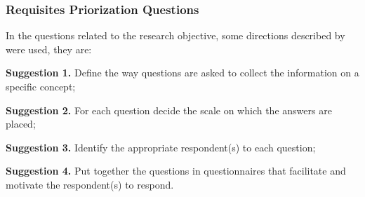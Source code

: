 \subsubsection{Requisites Priorization Questions}\label{sub:requisites-priorization}

In the questions related to the research objective, some directions described by \textcite{forza} were used, they are:
\begin{description}
  \item \textbf{Suggestion 1.} Define the way questions are asked to collect the information on a specific concept;\label{suggestion:1}
  \item \textbf{Suggestion 2.} For each question decide the scale on which the answers are placed;\label{suggestion:2}
  \item \textbf{Suggestion 3.} Identify the appropriate respondent(s) to each question;\label{suggestion:3}
  \item \textbf{Suggestion 4.} Put together the questions in questionnaires that facilitate and motivate the respondent(s) to respond.\label{suggestion:4}
\end{description}


